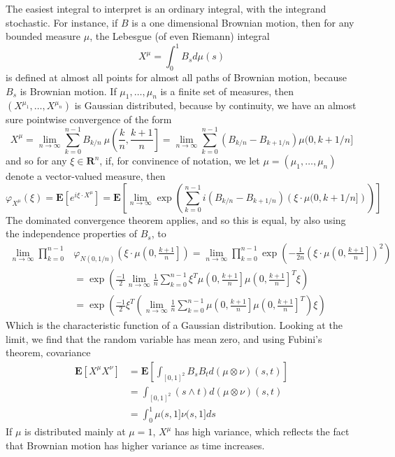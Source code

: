 \begin{example}
    The easiest integral to interpret is an ordinary integral, with the integrand stochastic. For instance, if $B$ is a one dimensional Brownian motion, then for any bounded measure $\mu$, the Lebesgue (of even Riemann) integral
    \[ X^\mu = \int_0^1 B_s d\mu(s) \]
    is defined at almost all points for almost all paths of Brownian motion, because $B_s$ is Brownian motion. If $\mu_1, \dots, \mu_n$ is a finite set of measures, then $(X^{\mu_1}, \dots, X^{\mu_n})$ is Gaussian distributed, because by continuity, we have an almost sure pointwise convergence of the form
    \[ X^\mu = \lim_{n \to \infty} \sum_{k = 0}^{n-1} B_{k/n}\ \mu \left( \frac{k}{n}, \frac{k+1}{n} \right] = \lim_{n \to \infty} \sum_{k = 0}^{n-1} (B_{k/n} - B_{k+1/n}) \mu (0, k+1/n] \]
    and so for any $\xi \in \mathbf{R}^n$, if, for convinence of notation, we let $\mu = (\mu_1, \dots, \mu_n)$ denote a vector-valued measure, then
    \[ \varphi_{X^\mu}(\xi) = \mathbf{E}[e^{i \xi \cdot X^\mu}] = \mathbf{E} \left[ \lim_{n \to \infty} \exp \left( \sum_{k = 0}^{n-1} i (B_{k/n} - B_{k+1/n}) \left( \xi \cdot \mu(0,k+1/n] \right) \right) \right] \]
    The dominated convergence theorem applies, and so this is equal, by also using the independence properties of $B_s$, to
    \begin{align*}
        \lim_{n \to \infty} \prod_{k = 0}^{n-1} & \varphi_{N(0,1/n)} \left(\xi \cdot \mu \left(0, \frac{k+1}{n} \right] \right) = \lim_{n \to \infty} \prod_{k = 0}^{n-1} \exp \left( - \frac{1}{2n} \left(\xi \cdot \mu \left(0, \frac{k+1}{n} \right] \right)^2 \right)\\
        &= \exp \left( \frac{-1}{2} \lim_{n \to \infty} \frac{1}{n} \sum_{k = 0}^{n-1} \xi^T \mu \left(0, \frac{k+1}{n} \right] \mu \left(0, \frac{k+1}{n} \right]^T \xi \right)\\
        &= \exp \left( \frac{-1}{2} \xi^T \left( \lim_{n \to \infty} \frac{1}{n} \sum_{k = 0}^{n-1} \mu \left(0, \frac{k+1}{n} \right] \mu \left(0, \frac{k+1}{n} \right]^T \right) \xi \right)
    \end{align*}
    Which is the characteristic function of a Gaussian distribution. Looking at the limit, we find that the random variable has mean zero, and using Fubini's theorem, covariance
    \begin{align*}
        \mathbf{E}[X^\mu X^\nu] &= \mathbf{E} \left[ \int_{[0,1]^2} B_sB_t d(\mu \otimes \nu)(s,t) \right]\\
        &= \int_{[0,1]^2} (s \wedge t) d(\mu \otimes \nu)(s,t)\\
        &= \int_0^1 \mu(s,1] \nu(s,1] ds
    \end{align*}
    If $\mu$ is distributed mainly at $\mu = 1$, $X^\mu$ has high variance, which reflects the fact that Brownian motion has higher variance as time increases.
\end{example}

